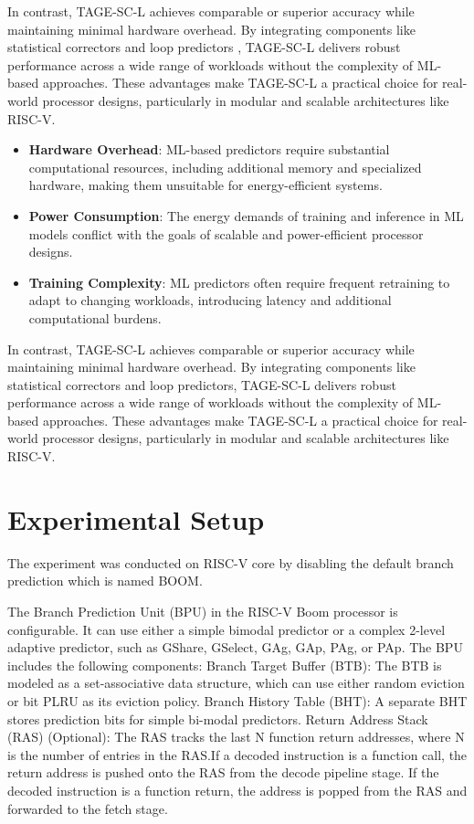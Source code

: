 \documentclass[10pt,journal,compsoc]{IEEEtran}
\begin{document}
In contrast, TAGE-SC-L achieves comparable or superior accuracy while maintaining minimal hardware overhead. By integrating components like statistical correctors and loop predictors \cite{seznecTAGESCBranchPredictors2014,seznecTAGESCBranchPredictorsAgain2016}, TAGE-SC-L delivers robust performance across a wide range of workloads without the complexity of ML-based approaches. These advantages make TAGE-SC-L a practical choice for real-world processor designs, particularly in modular and scalable architectures like RISC-V.

\begin{itemize}
    \item \textbf{Hardware Overhead}: ML-based predictors require substantial computational resources, including additional memory and specialized hardware, making them unsuitable for energy-efficient systems.
    \item \textbf{Power Consumption}: The energy demands of training and inference in ML models conflict with the goals of scalable and power-efficient processor designs.
    \item \textbf{Training Complexity}: ML predictors often require frequent retraining to adapt to changing workloads, introducing latency and additional computational burdens.
\end{itemize}

In contrast, TAGE-SC-L achieves comparable or superior accuracy while maintaining minimal hardware overhead. By integrating components like statistical correctors and loop predictors, TAGE-SC-L delivers robust performance across a wide range of workloads without the complexity of ML-based approaches. These advantages make TAGE-SC-L a practical choice for real-world processor designs, particularly in modular and scalable architectures like RISC-V.

\section{Experimental Setup}\label{experimentalSetup}
The experiment was conducted on RISC-V core by disabling the default branch prediction which is named BOOM\cite{BranchPredictionRISCVBOOMa}.

The Branch Prediction Unit (BPU) in the RISC-V Boom processor is configurable. It can use either a simple bimodal predictor or a complex 2-level adaptive predictor, such as GShare, GSelect, GAg, GAp, PAg, or PAp.
The BPU includes the following components:
Branch Target Buffer (BTB): The BTB is modeled as a set-associative data structure, which can use either random eviction or bit PLRU as its eviction policy.
Branch History Table (BHT): A separate BHT stores prediction bits for simple bi-modal predictors.
Return Address Stack (RAS) (Optional): The RAS tracks the last N function return addresses, where N is the number of entries in the RAS.If a decoded instruction is a function call, the return address is pushed onto the RAS from the decode pipeline stage. If the decoded instruction is a function return, the address is popped from the RAS and forwarded to the fetch stage.\cite{BranchPredictionRISCVBOOMa,BranchPredictionUnita}
\end{document}

